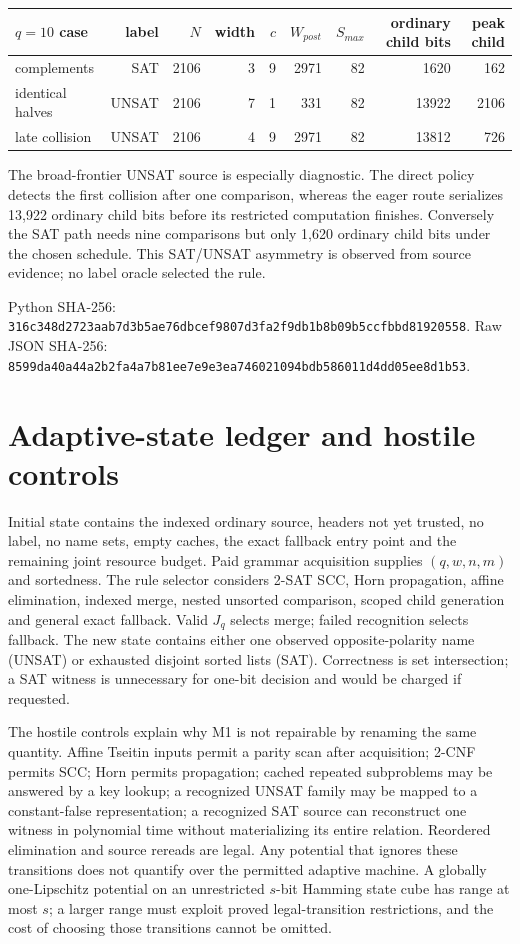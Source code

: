 \documentclass[11pt]{article}
\begin{document}
\begin{center}\small
\begin{tabular}{lrrrrrrrr}
\toprule
$q=10$ case & label & $N$ & width & $c$ & $W_{post}$ & $S_{max}$ &
ordinary child bits & peak child\\
\midrule
complements & SAT &2106&3&9&2971&82&1620&162\\
identical halves & UNSAT &2106&7&1&331&82&13922&2106\\
late collision & UNSAT &2106&4&9&2971&82&13812&726\\
\bottomrule
\end{tabular}
\end{center}

The broad-frontier UNSAT source is especially diagnostic.  The direct policy
detects the first collision after one comparison, whereas the eager route
serializes 13,922 ordinary child bits before its restricted computation
finishes.  Conversely the SAT path needs nine comparisons but only 1,620
ordinary child bits under the chosen schedule.  This SAT/UNSAT asymmetry is
observed from source evidence; no label oracle selected the rule.

Python SHA-256:
\texttt{316c348d2723aab7d3b5ae76dbcef9807d3fa2f9db1b8b09b5ccfbbd81920558}.
Raw JSON SHA-256:
\texttt{8599da40a44a2b2fa4a7b81ee7e9e3ea746021094bdb586011d4dd05ee8d1b53}.

\section{Adaptive-state ledger and hostile controls}
Initial state contains the indexed ordinary source, headers not yet trusted,
no label, no name sets, empty caches, the exact fallback entry point and the
remaining joint resource budget.  Paid grammar acquisition supplies
$(q,w,n,m)$ and sortedness.  The rule selector considers 2-SAT SCC, Horn
propagation, affine elimination, indexed merge, nested unsorted comparison,
scoped child generation and general exact fallback.  Valid $J_q$ selects
merge; failed recognition selects fallback.  The new state contains either
one observed opposite-polarity name (UNSAT) or exhausted disjoint sorted
lists (SAT).  Correctness is set intersection; a SAT witness is unnecessary
for one-bit decision and would be charged if requested.

The hostile controls explain why M1 is not repairable by renaming the same
quantity.  Affine Tseitin inputs permit a parity scan after acquisition;
2-CNF permits SCC; Horn permits propagation; cached repeated subproblems may
be answered by a key lookup; a recognized UNSAT family may be mapped to a
constant-false representation; a recognized SAT source can reconstruct one
witness in polynomial time without materializing its entire relation.
Reordered elimination and source rereads are legal.  Any potential that
ignores these transitions does not quantify over the permitted adaptive
machine.  A globally one-Lipschitz potential on an unrestricted $s$-bit
Hamming state cube has range at most $s$; a larger range must exploit proved
legal-transition restrictions, and the cost of choosing those transitions
cannot be omitted.
\end{document}
